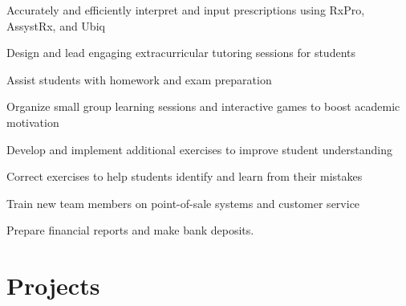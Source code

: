 \documentclass[letterpaper,10pt]{article}
\begin{document}
  \begin{resume_list}
    \item Accurately and efficiently interpret and input prescriptions using RxPro, AssystRx, and Ubiq
  \end{resume_list}

  \begin{resume_list}
    \item Design and lead engaging extracurricular tutoring sessions for students
    \item Assist students with homework and exam preparation
    \item Organize small group learning sessions and interactive games to boost academic motivation
    \item Develop and implement additional exercises to improve student understanding
    \item Correct exercises to help students identify and learn from their mistakes
  \end{resume_list}

  \begin{resume_list}
    \item Train new team members on point-of-sale systems and customer service
    \item Prepare financial reports and make bank deposits.
  \end{resume_list}
  \pagebreak


  \section{Projects}
\end{document}
